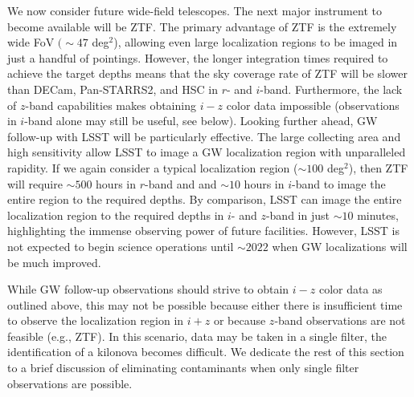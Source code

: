 \clearpage
We now consider future wide-field telescopes. The next major instrument to become available will be ZTF. The primary advantage of ZTF is the extremely wide FoV $(\sim47$ deg$^2$), allowing even large localization regions to be imaged in just a handful of pointings. However, the longer integration times required to achieve the target depths means that the sky coverage rate of ZTF will be slower than DECam, Pan-STARRS2, and HSC in $r$- and $i$-band. Furthermore, the lack of $z$-band capabilities makes obtaining $i-z$ color data impossible (observations in $i$-band alone may still be useful, see below). Looking further ahead, GW follow-up with LSST will be particularly effective. The large collecting area and high sensitivity allow LSST to image a GW localization region with unparalleled rapidity. If we again consider a typical localization region ($\sim 100$ deg$^2$), then ZTF will require $\sim500$ hours in $r$-band and and $\sim10$ hours in $i$-band to image the entire region to the required depths. By comparison, LSST can image the entire localization region to the required depths in $i$- and $z$-band in just $\sim10$ minutes, highlighting the immense observing power of future facilities. However, LSST is not expected to begin science operations until $\sim2022$ when GW localizations will be much improved.

While GW follow-up observations should strive to obtain $i-z$ color data as outlined above, this may not be possible because either there is insufficient time to observe the localization region in $i+z$ or because $z$-band observations are not feasible (e.g., ZTF). In this scenario, data may be taken in a single filter,  the identification of a kilonova becomes difficult. We dedicate the rest of this section to a brief discussion of eliminating contaminants when only single filter observations are possible.

